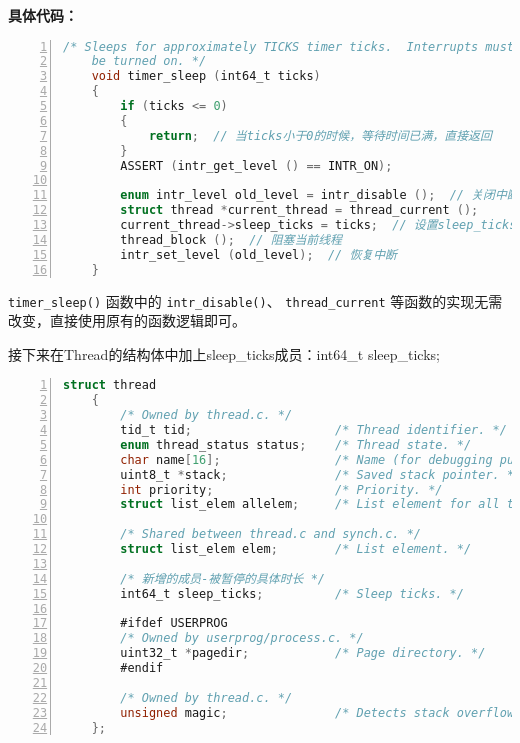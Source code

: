 \documentclass{article}
\begin{document}
	\textbf{具体代码：}
	
	\begin{lstlisting}[xleftmargin = 4em,xrightmargin = 4em, aboveskip = 1em, numbers = left, language = C,title=修改后的 \texttt{timer\_sleep()}函数]
    /* Sleeps for approximately TICKS timer ticks.  Interrupts must
    be turned on. */
    void timer_sleep (int64_t ticks)
    {
    	if (ticks <= 0)
    	{
    	    return;  // 当ticks小于0的时候，等待时间已满，直接返回
    	}
    	ASSERT (intr_get_level () == INTR_ON);
    	
    	enum intr_level old_level = intr_disable ();  // 关闭中断
    	struct thread *current_thread = thread_current ();
    	current_thread->sleep_ticks = ticks;  // 设置sleep_ticks
    	thread_block ();  // 阻塞当前线程
    	intr_set_level (old_level);  // 恢复中断
    }
	\end{lstlisting}
	
	\texttt{timer\_sleep()} 函数中的 \texttt{intr\_disable()}、 \texttt{thread\_current} 等函数的实现无需改变，直接使用原有的函数逻辑即可。
	
	接下来在Thread的结构体中加上sleep\_ticks成员：int64\_t sleep\_ticks;
	
	\begin{lstlisting}[xleftmargin = 4em,xrightmargin = 4em, aboveskip = 1em, numbers = left, language = C, title=修改后的线程结构体]
    struct thread
    {
        /* Owned by thread.c. */
        tid_t tid;                    /* Thread identifier. */
        enum thread_status status;    /* Thread state. */
        char name[16];                /* Name (for debugging purposes). */
        uint8_t *stack;               /* Saved stack pointer. */
        int priority;                 /* Priority. */
        struct list_elem allelem;     /* List element for all threads list. */
        	
        /* Shared between thread.c and synch.c. */
        struct list_elem elem;        /* List element. */
        
        /* 新增的成员-被暂停的具体时长 */
        int64_t sleep_ticks;          /* Sleep ticks. */
        	
        #ifdef USERPROG
        /* Owned by userprog/process.c. */
        uint32_t *pagedir;            /* Page directory. */
        #endif
        	
        /* Owned by thread.c. */
        unsigned magic;               /* Detects stack overflow. */
    };
	\end{lstlisting}
	
\end{document}
